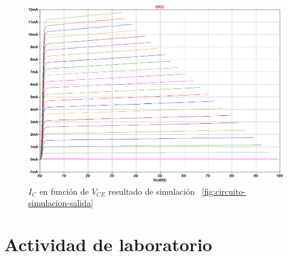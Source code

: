 \documentclass[chaptersright]{informeutn}
\begin{document}
      \begin{figure}[H]
          \centering
          \includegraphics[width=1\textwidth, keepaspectratio]{pictures/curva-simulacion-salida.png}
          \caption{$I_C$ en función de $V_{CE}$ resultado de simulación 
          ~\ref{fig:circuito-simulacion-salida}}
      \end{figure}

    

  \section{Actividad de laboratorio}
    
\end{document}
